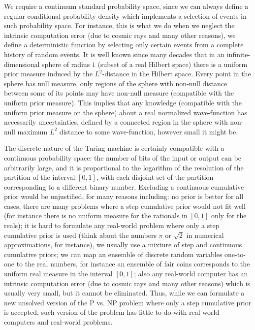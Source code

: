 \documentclass[11pt]{book}
\begin{document}
We require a continuum standard probability space, since we can always
define a regular conditional probability density which implements a
selection of events in such probability
space\cite{durrett2019probability}. For
instance, this is what we do when we neglect the intrinsic computation
error (due to cosmic rays and many other reasons), we define a
deterministic function by selecting only certain events from a complete
history of random events. It is well known since many decades that in an
infinite-dimensional sphere of radius \(1\) (subset of a real Hilbert
space) there is a uniform prior measure induced by the \(L^2\)-distance
in the Hilbert
space\cite{Peterson2019GaussianLA}.
Every point in the sphere has null measure, only regions of the sphere
with non-null distance between some of its points may have non-null
measure (compatible with the uniform prior measure). This implies that
any knowledge (compatible with the uniform prior measure on the sphere)
about a real normalized wave-function has necessarily uncertainties,
defined by a connected region in the sphere with non-null maximum
\(L^2\) distance to some wave-function, however small it might be.

The discrete nature of the Turing machine is certainly compatible with a
continuous probability space: the number of bits of the input or output
can be arbitrarily large, and it is proportional to the logarithm of the
resolution of the partition of the interval \([0,1]\), with each
disjoint set of the partition corresponding to a different binary
number. Excluding a continuous cumulative prior would be unjustified,
for many reasons including: no prior is better for all
cases\cite{dutchbook}, there
are many problems where a step cumulative prior would not fit well (for
instance there is no uniform measure for the rationals in \([0,1]\) only
for the reals); it is hard to formulate any real-world problem where
only a step cumulative prior is used (think about the numbers \(\pi\) or
\(\sqrt{2}\) in numerical approximations, for instance), we usually use
a mixture of step and continuous cumulative priors; we can map an
ensemble of discrete random variables one-to-one to the real numbers,
for instance an ensemble of fair coins corresponds to the uniform real
measure in the interval \([0,1]\); also any real-world computer has an
intrinsic computation error (due to cosmic rays and many other reasons)
which is usually very small, but it cannot be eliminated. Thus, while we
can formulate a new unsolved version of the P vs. NP problem where only
a step cumulative prior is accepted, such version of the problem has
little to do with real-world computers and real-world problems.
\end{document}
